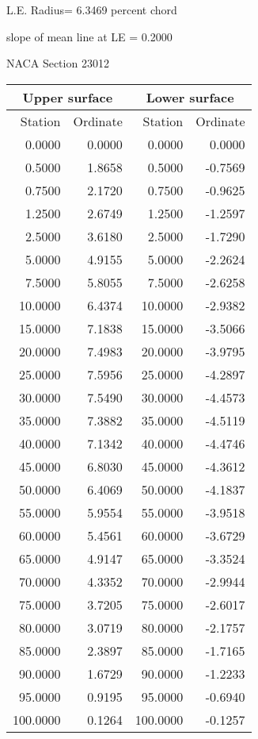 \documentclass[11pt]{book}
\begin{document}
L.E. Radius=  6.3469 percent chord


 slope of mean line at LE =  0.2000
 \newpage
  \label{s23012}
 \begin{Large}
 NACA Section 23012
 \end{Large}
  
 \vspace{8mm}
 \begin{tabular}{|r|r|r|r|} \hline 
 \multicolumn{2}{|c|}{Upper surface} & \multicolumn{2}{|c|}{Lower surface} \\
 \hline
 Station & Ordinate & Station & Ordinate \\
 \hline
0.0000 & 0.0000 & 0.0000 & 0.0000 \\
0.5000 & 1.8658 & 0.5000 & -0.7569 \\
0.7500 & 2.1720 & 0.7500 & -0.9625 \\
1.2500 & 2.6749 & 1.2500 & -1.2597 \\
2.5000 & 3.6180 & 2.5000 & -1.7290 \\
5.0000 & 4.9155 & 5.0000 & -2.2624 \\
7.5000 & 5.8055 & 7.5000 & -2.6258 \\
10.0000 & 6.4374 & 10.0000 & -2.9382 \\
15.0000 & 7.1838 & 15.0000 & -3.5066 \\
20.0000 & 7.4983 & 20.0000 & -3.9795 \\
25.0000 & 7.5956 & 25.0000 & -4.2897 \\
30.0000 & 7.5490 & 30.0000 & -4.4573 \\
35.0000 & 7.3882 & 35.0000 & -4.5119 \\
40.0000 & 7.1342 & 40.0000 & -4.4746 \\
45.0000 & 6.8030 & 45.0000 & -4.3612 \\
50.0000 & 6.4069 & 50.0000 & -4.1837 \\
55.0000 & 5.9554 & 55.0000 & -3.9518 \\
60.0000 & 5.4561 & 60.0000 & -3.6729 \\
65.0000 & 4.9147 & 65.0000 & -3.3524 \\
70.0000 & 4.3352 & 70.0000 & -2.9944 \\
75.0000 & 3.7205 & 75.0000 & -2.6017 \\
80.0000 & 3.0719 & 80.0000 & -2.1757 \\
85.0000 & 2.3897 & 85.0000 & -1.7165 \\
90.0000 & 1.6729 & 90.0000 & -1.2233 \\
95.0000 & 0.9195 & 95.0000 & -0.6940 \\
100.0000 & 0.1264 & 100.0000 & -0.1257 \\
 \hline 
 \end{tabular}
\end{document}
